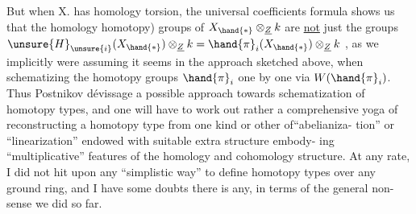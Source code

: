 But when X. has homology torsion, the universal coefficients formula
shows us that the homology \deleted{(=} homotopy) groups of $X_{\hand{\ast}}\otimes_{\underline{Z}}k$ are \uline{not} just
the groups $\unsure{H}_{\unsure{i}}(X_{\hand{\ast}})\otimes_{\underline{Z}}k = \hand{\pi}_i(X_{\hand{\ast}})\otimes_{\underline{Z}}k$ , as we implicitly were assuming it
seems in the approach sketched above, when schematizing the homotopy
groups $\hand{\pi}_i$  one by one via $W(\hand{\pi}_i)$. Thus  Postnikov dévissage  
a possible approach towards schematization of homotopy types, and one
will have to work out rather a comprehensive yoga of reconstructing
a homotopy type from  one kind or other of``abelianiza-%
tion'' or ``linearization''  endowed with suitable extra structure embody-%
ing ``multiplicative'' features of the homology and cohomology structure.
At any rate, I did not hit upon any ``simplistic way'' to define homotopy
types over any ground ring, and I have some doubts there is any, in
terms of the general non-sense  we did so far. 


